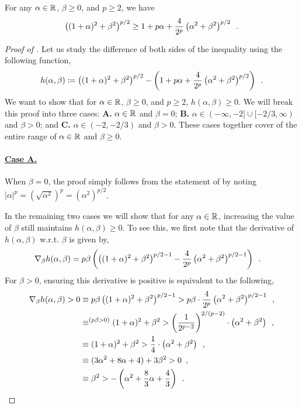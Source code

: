 \begin{lemma}\label{lemma:gp_sc_alphaall}
    For any $\alpha\in \mathbb{R}$, $\beta\ge 0$, and $p \ge 2$, we have
\begin{align*}
    \left((1+\alpha)^2+\beta^2\right)^{p/2} \ge 1+p\alpha + \frac{4}{2^p}\left(\alpha^2+\beta^2\right)^{p/2}\enspace.
\end{align*}
\end{lemma}
\begin{proof}[Proof of ]
    Let us study the difference of both sides of the inequality using the following function,
    \begin{align*}
        h(\alpha, \beta) \coloneqq \left((1+\alpha)^2+\beta^2\right)^{p/2} - \left(1+p\alpha + \frac{4}{2^p}\left(\alpha^2+\beta^2\right)^{p/2}\right)\enspace.
    \end{align*}
    We want to show that for $\alpha\in \mathbb{R}$, $\beta\ge 0$, and $p \ge 2$, $h(\alpha, \beta) \geq 0$. We will break this proof into three cases: \textbf{A.} $\alpha \in \mathbb{R}$ and $\beta =0$; \textbf{B.} $\alpha \in (-\infty, -2]\cup[-2/3,\infty)$ and $\beta >0$; and \textbf{C.} $\alpha \in (-2, -2/3)$ and $\beta>0$. These cases together cover of the entire range of $\alpha\in \mathbb{R}$ and $\beta\geq 0$.
    
    \paragraph{\underline{Case A.}} When $\beta=0$, the proof simply follows from the statement of  by noting $|\alpha|^{p} = (\sqrt{\alpha^2})^{p} = (\alpha^2)^{p/2}$. 
    
    In the remaining two cases we will show that for any $\alpha\in \mathbb{R}$, increasing the value of $\beta$ still maintains $h(\alpha, \beta) \geq 0$. To see this, we first note that the derivative of $h(\alpha, \beta)$ w.r.t. $\beta$ is given by,
    \begin{align*}
        \nabla_\beta h(\alpha, \beta) &= p\beta\left(\left((1+\alpha)^2+\beta^2\right)^{p/2-1} - \frac{4}{2^p}\left(\alpha^2+\beta^2\right)^{p/2-1}\right)\enspace.
    \end{align*}
    For $\beta > 0$, ensuring this derivative is positive is equivalent to the following,
    \begin{align}
        \nabla_\beta h(\alpha, \beta) > 0 &\equiv p\beta\left((1+\alpha)^2+\beta^2\right)^{p/2-1} > p\beta \cdot \frac{4}{2^p}\left(\alpha^2+\beta^2\right)^{p/2-1}\enspace,\nonumber\\
        &\equiv^{(p\beta > 0)} (1+\alpha)^2 + \beta^2  > \left(\frac{1}{2^{p-2}}\right)^{2/(p-2)}\cdot \left(\alpha^2 + \beta^2\right)\enspace,\nonumber\\
        &\equiv (1+\alpha)^2 + \beta^2  > \frac{1}{4}\cdot \left(\alpha^2 + \beta^2\right)\enspace,\nonumber\\
        &\equiv (3\alpha^2 + 8\alpha + 4) + 3\beta^2  > 0\enspace,\nonumber\\
        &\equiv \beta^2 > -\left(\alpha^2 + \frac{8}{3}\alpha + \frac{4}{3}\right)\enspace.\label{eq:grad_pos_equiv}
    \end{align}
    

\end{proof}
